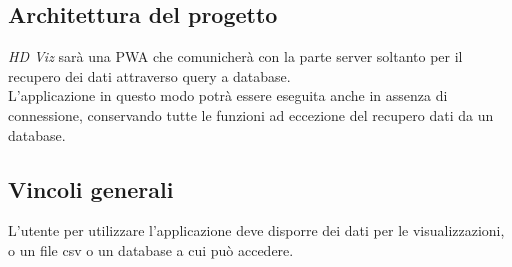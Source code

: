 \subsection{Architettura del progetto}
\emph{HD Viz} sarà una PWA che comunicherà con la parte server soltanto per il recupero dei dati attraverso query a database.
\\
L'applicazione in questo modo potrà essere eseguita anche in assenza di connessione, conservando tutte le funzioni ad eccezione del recupero dati da un database.

\subsection{Vincoli generali}
L'utente per utilizzare l'applicazione deve disporre dei dati per le visualizzazioni, o un file csv o un database a cui può accedere.